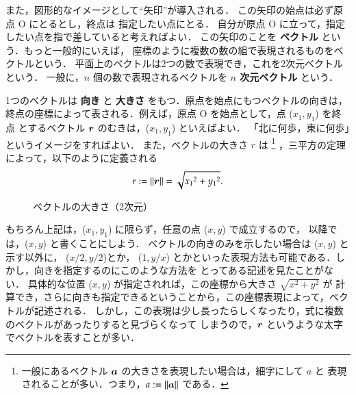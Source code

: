                 また，図形的なイメージとして“矢印”が導入される．
                この矢印の始点は必ず原点 O にとるとし，終点は
                指定したい点にとる．
                自分が原点 O に立って，指定したい点を指で差していると考えればよい．
                この矢印のことを \textbf{ベクトル} という．もっと一般的にいえば，
                座標のように複数の数の組で表現されるものをベクトルという．
                平面上のベクトルは2つの数で表現でき，これを2次元ベクトルという．
                一般に，$n$ 個の数で表現されるベクトルを \textbf{$n$ 次元ベクトル} という．

                1つのベクトルは \textbf{向き} と \textbf{大きさ} をもつ．原点を始点にもつベクトルの向きは，
                終点の座標によって表される．例えば，原点 O を始点として，点 ($x_{1}$,\,$y_{1}$) を終点
                とするベクトル $\boldsymbol{r}$ のむきは，($x_{1}$,\,$y_{1}$) といえばよい．
                「北に何歩，東に何歩」というイメージをすればよい．
                また，ベクトルの大きさ $r$ は
                    \footnote{
                        一般にあるベクトル $\boldsymbol{a}$ の大きさを表現したい場合は，細字にして $a$ と
                        表現されることが多い．つまり，$a:=\|\boldsymbol{a}\|$ である．
                    }
                ，三平方の定理によって，以下のように定義される
                \begin{align}
                    r: = \|\boldsymbol{r}\| =\sqrt{{x_{1}}^{2}+{y_{1}}^{2}}.
                \end{align}
                \begin{figure}[hbt]
                        \begin{center}
                        \caption{ベクトルの大きさ（2次元）}
                        \label{fig:vector_learge}
                    \end{center}
                \end{figure}

                もちろん上記は，($x_{1}$,\,$y_{1}$) に限らず，任意の点 ($x$,\,$y$) で成立するので，
                以降では，($x$,\,$y$) と書くことにしよう．
                ベクトルの向きのみを示したい場合は ($x$,\,$y$) と示す以外に， ($x/2$,\,$y/2$)とか，
                (1,\,$y/x$) とかといった表現方法も可能である．しかし，向きを指定するのにこのような方法を
                とってある記述を見たことがない．
                具体的な位置 ($x$,\,$y$) が指定されれば，この座標から大きさ $\sqrt{x^{2}+y^{2}}$ が
                計算でき，さらに向きも指定できるということから，この座標表現によって，ベクトルが記述される．
                しかし，この表現は少し長ったらしくなったり，式に複数のベクトルがあったりすると見づらくなって
                しまうので，$\boldsymbol{r}$ というような太字でベクトルを表すことが多い．



